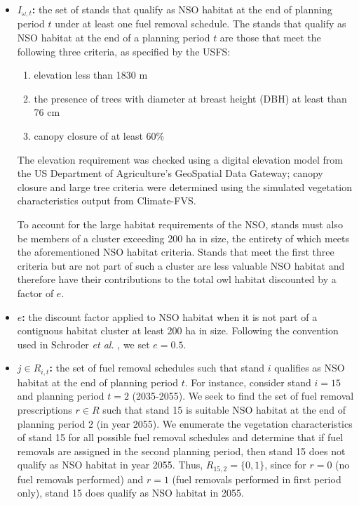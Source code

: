 \begin{itemize}
\item \textbf{$I_{\omega,t}$:} the set of stands that qualify as NSO habitat at the end of planning period $t$ under at least one fuel removal schedule. The stands that qualify as NSO habitat at the end of a planning period $t$ are those that meet the following three criteria, as specified by the USFS:
	\begin{enumerate}
	\item elevation less than 1830 m
	\item the presence of trees with diameter at breast height (DBH) at least than 76 cm
	\item canopy closure of at least 60\%
	\end{enumerate}
The elevation requirement was checked using a digital elevation model from the US Department of Agriculture's GeoSpatial Data Gateway; canopy closure and large tree criteria were determined using the simulated vegetation characteristics output from Climate-FVS.

To account for the large habitat requirements of the NSO, stands must also be members of a cluster exceeding 200 ha in size, the entirety of which meets the aforementioned NSO habitat criteria. Stands that meet the first three criteria but are not part of such a cluster are less valuable NSO habitat and therefore have their contributions to the total owl habitat discounted by a factor of $e$.

\item \textbf{$e$:} the discount factor applied to NSO habitat when it is not part of a contiguous habitat cluster at least 200 ha in size. Following the convention used in Schroder \textit{et al.} \cite{schroder2016multi}, we set $e = 0.5$.

\item \textbf{$j \in R_{i,t}$:} the set of fuel removal schedules such that stand $i$ qualifies as NSO habitat at the end of planning period $t$. For instance, consider stand $i=15$ and planning period $t=2$ (2035-2055). We seek to find the set of fuel removal prescriptions $r \in R$ such that stand 15 is suitable NSO habitat at the end of planning period 2 (in year 2055). We enumerate the vegetation characteristics of stand 15 for all possible fuel removal schedules and determine that if fuel removals are assigned in the second planning period, then stand 15 does not qualify as NSO habitat in year 2055. Thus, $R_{15,2} = \{0,1\}$, since for $r=0$ (no fuel removals performed) and $r=1$ (fuel removals performed in first period only), stand 15 does qualify as NSO habitat in 2055.


\end{itemize}
